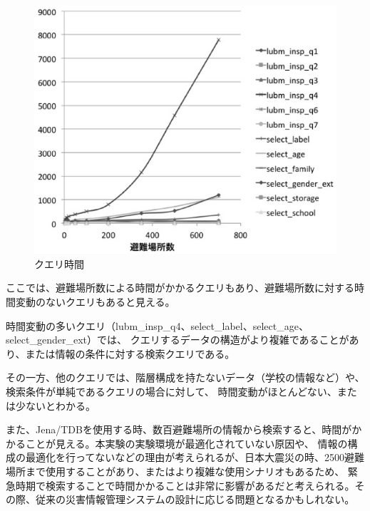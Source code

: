 \begin{figure}[t!]
 	\begin{center}
 		\includegraphics[width=120mm]{./images/test_query1.eps}
 		\caption{クエリ時間}
 		\label{fig:sibm_query_time}
 	\end{center}
\end{figure}

ここでは、避難場所数による時間がかかるクエリもあり、避難場所数に対する時間変動のないクエリもあると見える。

時間変動の多いクエリ（lubm\_insp\_q4、select\_label、select\_age、select\_gender\_ext）では、
クエリするデータの構造がより複雑であることがあり、または情報の条件に対する検索クエリである。

その一方、他のクエリでは、階層構成を持たないデータ（学校の情報など）や、検索条件が単純であるクエリの場合に対して、
時間変動がほとんどない、または少ないとわかる。

また、Jena/TDBを使用する時、数百避難場所の情報から検索すると、時間がかかることが見える。本実験の実験環境が最適化されていない原因や、
情報の構成の最適化を行ってないなどの理由が考えられるが、日本大震災の時、2500避難場所まで使用することがあり、またはより複雑な使用シナリオもあるため、
緊急時期で検索することで時間かかることは非常に影響があるだと考えられる。その際、従来の災害情報管理システムの設計に応じる問題となるかもしれない。
